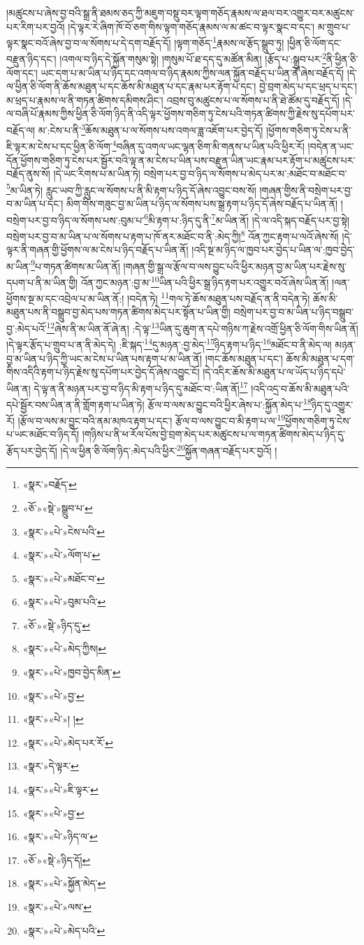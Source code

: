 །མཚུངས་པ་ཞེས་བྱ་བའི་སྒྲ་ནི་ཐམས་ཅད་ཀྱི་མཇུག་བསྡུ་བར་ལྟག་གཅོད་རྣམས་ལ་ཐལ་བར་འགྱུར་བར་མཚུངས་པར་རིག་པར་བྱའོ། །དེ་ལྟར་རེ་ཞིག་ཁོ་བོ་ཅག་གིས་ལྟག་གཅོད་རྣམས་ལ་མ་ཚང་བ་ལྟར་སྣང་བ་དང་། མ་གྲུབ་པ་ལྟར་སྣང་བའོ་ཞེས་བྱ་བ་ལ་སོགས་པ་དེ་དག་བརྗོད་དོ། །ལྟག་གཅོད་\footnote{«སྣར་»བརྗོད་}རྣམས་ལ་རྩོད་སྒྲུབ་ཏུ། །ཕྱིན་ཅི་ལོག་དང་བརྫུན་ཉིད་དང་། །འགལ་བ་ཉིད་དེ་སྐྱོན་གསུམ་སྟེ། །གསུམ་པོ་ཐ་དད་དུ་མཚོན་མིན། །རྩོད་པ་:སྒྲུབ་པར་\footnote{«ཅོ་»«སྡེ་»སྒྲུབ་པ་}ནི་ཕྱིན་ཅི་ལོག་དང་། ཡང་དག་པ་མ་ཡིན་པ་ཉིད་དང་འགལ་བ་ཉིད་རྣམས་ཀྱིས་ལན་སྐྱོན་བརྗོད་པ་ཡིན་ནོ་ཞེས་བརྗོད་དོ། །དེ་ལ་ཕྱིན་ཅི་ལོག་ནི་ཆོས་མཐུན་པ་དང་ཆོས་མི་མཐུན་པ་དང་རྣམ་པར་རྟོག་པ་དང་། བྱེ་བྲག་མེད་པ་དང་ཕྲད་པ་དང་། མ་ཕྲད་པ་རྣམས་ལ་ནི་གཏན་ཚིགས་དམིགས་ཤིང་། འབྲས་བུ་མཚུངས་པ་ལ་སོགས་པ་ནི་ཐེ་ཚོམ་དུ་བརྗོད་དོ། །དེ་ལ་བཞི་པོ་རྣམས་ཀྱིས་ཕྱིན་ཅི་ལོག་ཉིད་ནི་འདི་ལྟར་ཕྱོགས་གཅིག་ཏུ་ངེས་པའི་གཏན་ཚིགས་ཀྱི་རྗེས་སུ་དཔོག་པར་བརྗོད་ལ། མ་:ངེས་པ་ནི་\footnote{«སྣར་»«པེ་»ངེས་པའི་}ཆོས་མཐུན་པ་ལ་སོགས་པས་འགལ་ཟླ་འཇོག་པར་བྱེད་དོ། །ཕྱོགས་གཅིག་ཏུ་ངེས་པ་ནི་ཇི་ལྟར་མ་ངེས་པ་དང་ཕྱིན་ཅི་ལོག་\footnote{«སྣར་»«པེ་»ལོག་པ་}བཞིན་དུ་འགལ་ཡང་ལྷན་ཅིག་མི་གནས་པ་ཡིན་པའི་ཕྱིར་རོ། །བདེན་ན་ཡང་དོན་ཕྱོགས་གཅིག་ཏུ་ངེས་པར་སྦྱོར་བའི་ལྟ་ན་མ་ངེས་པ་ཡིན་པས་བརྫུན་ཡིན་ཡང་རྣམ་པར་རྟོག་པ་མཚུངས་པར་བརྗོད་ནུས་སོ། །དེ་ཡང་རིགས་པ་མ་ཡིན་ཏེ། བསྲེག་པར་བྱ་བ་ཉིད་ལ་སོགས་པ་མེད་པར་མ་:མཐོང་བ་མཐོང་བ་\footnote{«སྣར་»«པེ་»མཐོང་བ་}མ་ཡིན་ཏེ། རླུང་ཡབ་ཀྱི་རླུང་ལ་སོགས་པ་ནི་མི་རྟག་པ་ཉིད་དོ་ཞེས་འབྱུང་བས་སོ། །གཞན་གྱིས་ནི་བསྲེག་པར་བྱ་བ་མ་ཡིན་པ་དང་། མིག་གིས་གཟུང་བྱ་མ་ཡིན་པ་ཉིད་ལ་སོགས་པས་སྒྲ་རྟག་པ་ཉིད་དོ་ཞེས་བརྗོད་པ་ཡིན་ནོ། །བསྲེག་པར་བྱ་བ་ཉིད་ལ་སོགས་པས་:བུམ་པ་\footnote{«སྣར་»«པེ་»བུམ་པའི་}མི་རྟག་པ་:ཉིད་དུ་ནི་\footnote{«ཅོ་»«སྡེ་»ཉིད་དུ་}མ་ཡིན་ནོ། །དེ་ལ་འདི་སྐད་བརྗོད་པར་བྱ་སྟེ། བསྲེག་པར་བྱ་བ་མ་ཡིན་པ་ལ་སོགས་པ་རྟག་པ་ཁོ་ནར་མཐོང་བ་ནི་:མེད་ཀྱི།\footnote{«སྣར་»«པེ་»མེད་ཀྱིས།} འོན་ཀྱང་རྟག་པ་ལའོ་ཞེས་སོ། །དེ་ལྟར་ནི་གཞན་གྱི་ཕྱོགས་ལ་མ་ངེས་པ་ཉིད་བརྗོད་པ་ཡིན་ནོ། །འདི་སྔ་མ་ཉིད་ལ་ཁྱབ་པར་བྱེད་པ་ཡིན་ལ་:ཁྱབ་བྱེད་མ་ཡིན་\footnote{«སྣར་»«པེ་»ཁྱབ་བྱེད་མིན་}པ་གཏན་ཚིགས་མ་ཡིན་ནོ། །གཞན་གྱི་སྒྲ་ལ་རྩོལ་བ་ལས་བྱུང་པའི་ཕྱིར་མཉན་བྱ་མ་ཡིན་པར་རྗེས་སུ་དཔག་པ་ནི་མ་ཡིན་གྱི། འོན་ཀྱང་མཉན་:བྱ་མ་\footnote{«སྣར་»«པེ་»བྱ་}ཡིན་པའི་ཕྱིར་སྒྲ་ཉིད་རྟག་པར་འགྱུར་བའོ་ཞེས་ཡིན་ནོ། །ལན་ཕྱོགས་སྔ་མ་དང་འབྲེལ་པ་མ་ཡིན་ནོ:། །བདེན་ཏེ། \footnote{«སྣར་»«པེ་»། ། }གལ་ཏེ་ཆོས་མཐུན་པས་བརྗོད་ན་ནི་བདེན་ཏེ། ཆོས་མི་མཐུན་པས་ནི་བསྒྲུབ་བྱ་མེད་པས་གཏན་ཚིགས་མེད་པར་སྟོན་པ་ཡིན་གྱི། བསྲེག་པར་བྱ་བ་མ་ཡིན་པ་ཉིད་བསྒྲུབ་བྱ་:མེད་པའོ་\footnote{«སྣར་»«པེ་»མེད་པར་རོ་}ཞེས་ནི་མ་ཡིན་ནོ་ཞེ་ན། :དེ་ལྟ་\footnote{«སྣར་»དེ་ལྟར་}ཡིན་དུ་ཆུག་ན་དཔེ་གཉིས་ཀ་རྗེས་འགྲོ་ཕྱིན་ཅི་ལོག་གིས་ཡིན་ནོ། །དེ་ལྟར་རྩོད་པ་གྲུབ་པ་ན་ནི་མེད་དེ། :ཇི་སྐད་\footnote{«སྣར་»«པེ་»ཇི་ལྟར་}དུ་མཉན་:བྱ་མེད་\footnote{«སྣར་»«པེ་»བྱ་}ཉིད་རྟག་པ་ཉིད་\footnote{«སྣར་»«པེ་»ཉིད་ལ་}མཐོང་བ་ནི་མེད་ལ། མཉན་བྱ་མ་ཡིན་པ་ཉིད་ཀྱི་ཡང་མ་ངེས་པ་ཡིན་པས་རྟག་པ་མ་ཡིན་ནོ། །གང་ཆོས་མཐུན་པ་དང་། ཆོས་མི་མཐུན་པ་དག་གིས་འདིའི་རྟག་པ་ཉིད་རྗེས་སུ་དཔོག་པར་བྱེད་དོ་ཞེས་འབྱུང་ངོ། །དེ་འདིར་ཆོས་མི་མཐུན་པ་ལ་ཡོད་པ་ཉིད་དཔེ་ཡིན་ན། དེ་ལྟ་ན་ནི་མཉན་པར་བྱ་བ་ཉིད་མི་རྟག་པ་ཉིད་དུ་མཐོང་བ་:ཡིན་ནོ།\footnote{«ཅོ་»«སྡེ་»ཉིད་དོ།} །འདི་འདྲ་བ་ཆོས་མི་མཐུན་པའི་དཔེ་སྦྱོར་བས་ཡིན་ན་ནི་གློག་རྟག་པ་ཡིན་ཏེ། རྩོལ་བ་ལས་མ་བྱུང་བའི་ཕྱིར་ཞེས་པ་:སྐྱོན་མེད་པ་\footnote{«སྣར་»«པེ་»སྐྱོན་མེད་}ཉིད་དུ་འགྱུར་རོ། །རྩོལ་བ་ལས་མ་བྱུང་བའི་ནམ་མཁའ་རྟག་པ་དང་། རྩོལ་བ་ལས་བྱུང་བ་མི་རྟག་པ་ལ་\footnote{«སྣར་»«པེ་»ལས་}ཕྱོགས་གཅིག་ཏུ་ངེས་པ་ཡང་མཐོང་བ་ཉིད་དོ། །གཉིས་པ་ནི་ཕ་རོལ་པོས་བྱེ་བྲག་མེད་པར་མཚུངས་པ་ལ་གཏན་ཚིགས་མེད་པ་ཉིད་དུ་རྩོད་པར་བྱེད་དོ། །དེ་ལ་ཕྱིན་ཅི་ལོག་ཉིད་:མེད་པའི་ཕྱིར་\footnote{«སྣར་»«པེ་»མེད་པའི་}སྐྱོན་གཞན་བརྗོད་པར་བྱའོ། །
